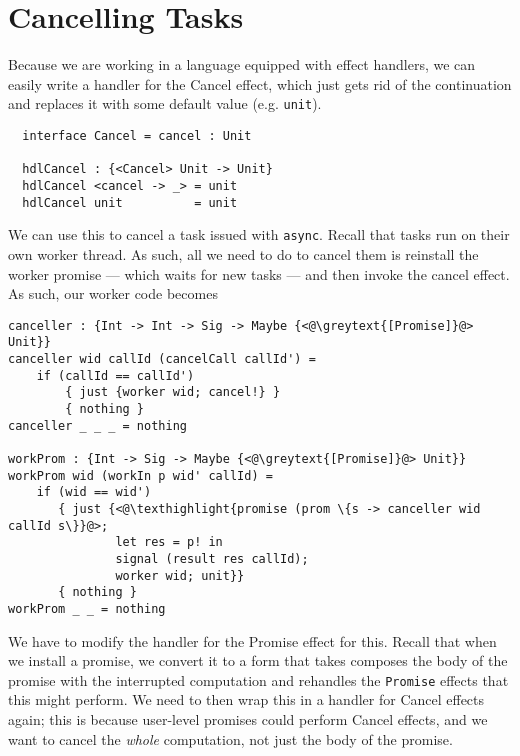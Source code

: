 \documentclass[msc,deptreport,cs]{infthesis} %
\newcommand{\code}[1]{\lstinline{#1}}
\newcommand{\texthighlight}[1]{%
  \colorbox{red!20}{#1}}
\newcommand{\greytext}[1]{\textcolor{black!40}{#1}}
\begin{document}
\section{Cancelling Tasks}

Because we are working in a language equipped with effect handlers, we can
easily write a handler for the \textsf{Cancel} effect, which just gets rid of
the continuation and replaces it with some default value (e.g. \code{unit}).

\begin{lstlisting}
  interface Cancel = cancel : Unit
 
  hdlCancel : {<Cancel> Unit -> Unit}
  hdlCancel <cancel -> _> = unit
  hdlCancel unit          = unit
\end{lstlisting}


We can use this to cancel a task issued with \code{async}. Recall that tasks run
on their own worker thread. As such, all we need to do to cancel them is
reinstall the worker promise --- which waits for new tasks --- and then invoke
the cancel effect. As such, our worker code becomes

\begin{lstlisting}
canceller : {Int -> Int -> Sig -> Maybe {<@\greytext{[Promise]}@> Unit}}
canceller wid callId (cancelCall callId') =
    if (callId == callId')
        { just {worker wid; cancel!} }
        { nothing }
canceller _ _ _ = nothing

workProm : {Int -> Sig -> Maybe {<@\greytext{[Promise]}@> Unit}}
workProm wid (workIn p wid' callId) =
    if (wid == wid')
       { just {<@\texthighlight{promise (prom \{s -> canceller wid callId s\}}@>;
               let res = p! in
               signal (result res callId);
               worker wid; unit}}
       { nothing }
workProm _ _ = nothing
\end{lstlisting}

We have to modify the handler for the \textsf{Promise} effect for this. Recall
that when we install a promise, we convert it to a form that takes composes the
body of the promise with the interrupted computation and rehandles the
\code{Promise} effects that this might perform.
%
We need to then wrap this in a handler for \textsf{Cancel} effects again; this
is because user-level promises could perform \textsf{Cancel} effects, and we
want to cancel the \emph{whole} computation, not just the body of the promise.
\end{document}
